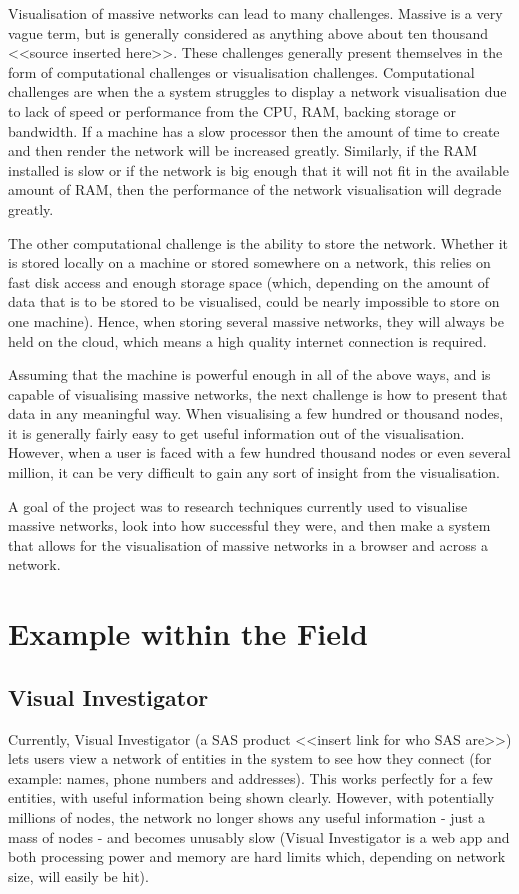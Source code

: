 \documentclass[../dissertation.tex]{subfiles}
\begin{document}
Visualisation of massive networks can lead to many challenges. Massive is a very vague term, but is generally considered as anything above about ten thousand <<source inserted here>>. These challenges generally present themselves in the form of computational challenges or visualisation challenges. Computational challenges are when the a system struggles to display a network visualisation due to lack of speed or performance from the CPU, RAM, backing storage or bandwidth. If a machine has a slow processor then the amount of time to create and then render the network will be increased greatly. Similarly, if the RAM installed is slow or if the network is big enough that it will not fit in the available amount of RAM, then the performance of the network visualisation will degrade greatly. 

The other computational challenge is the ability to store the network. Whether it is stored locally on a machine or stored somewhere on a network, this relies on fast disk access and enough storage space (which, depending on the amount of data that is to be stored to be visualised, could be nearly impossible to store on one machine). Hence, when storing several massive networks, they will always be held on the cloud, which means a high quality internet connection is required. 

Assuming that the machine is powerful enough in all of the above ways, and is capable of visualising massive networks, the next challenge is how to present that data in any meaningful way. When visualising a few hundred or thousand nodes, it is generally fairly easy to get useful information out of the visualisation. However, when a user is faced with a few hundred thousand nodes or even several million, it can be very difficult to gain any sort of insight from the visualisation. 

A goal of the project was to research techniques currently used to visualise massive networks, look into how successful they were, and then make a system that allows for the visualisation of massive networks in a browser and across a network. 

\section{Example within the Field}

\subsection{Visual Investigator}
Currently, Visual Investigator (a SAS product <<insert link for who SAS are>>) lets users view a network of entities in the system to see how they connect (for example: names, phone numbers and addresses). This works perfectly for a few entities, with useful information being shown clearly. However, with potentially millions of nodes, the network no longer shows any useful information - just a mass of nodes - and becomes unusably slow (Visual Investigator is a web app and both processing power and memory are hard limits which, depending on network size, will easily be hit).
\end{document}
